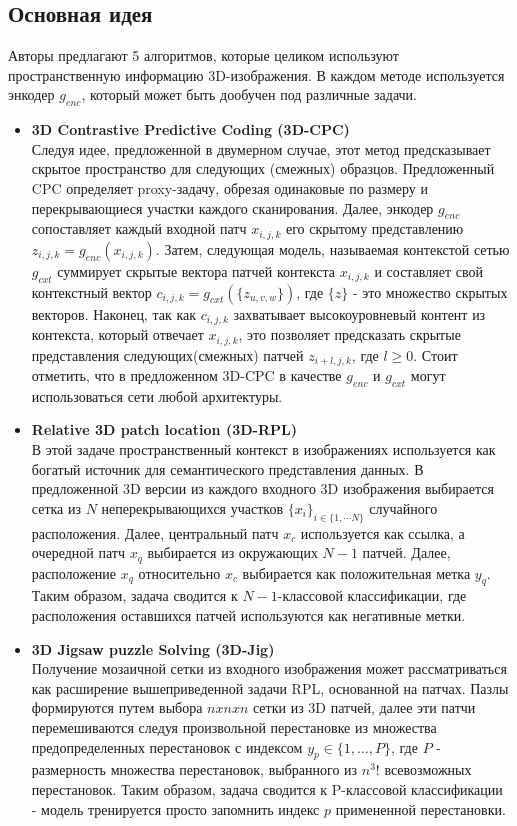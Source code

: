 \subsection*{Основная идея}
Авторы предлагают 5 алгоритмов, которые целиком используют пространственную информацию
3D-изображения. В каждом методе используется энкодер \(g_{enc}\), который 
может быть дообучен под различные задачи.
\begin{itemize}
    \item \textbf{3D Contrastive Predictive Coding (3D-CPC)} \\
    Следуя идее, предложенной в двумерном случае, этот метод предсказывает скрытое 
    пространство для следующих (смежных) образцов. Предложенный CPC определяет 
    proxy-задачу, обрезая одинаковые по размеру и перекрывающиеся участки каждого 
    сканирования. Далее, энкодер \(g_{enc}\) сопоставляет каждый входной патч 
    \(x_{i,j,k}\) его скрытому представлению \(z_{i,j,k}= g_{enc}(x_{i,j,k})\). Затем, 
    следующая модель, называемая контекстой сетью \(g_{cxt}\) суммирует скрытые вектора патчей
    контекста \(x_{i,j,k}\) и составляет свой контекстный вектор 
    \(c_{i,j,k}=g_{cxt}(\{z_{u,v,w}\})\), где \(\{z\}\) - это множество скрытых векторов.
    Наконец, так как \(c_{i,j,k}\) захватывает высокоуровневый контент из контекста, который 
    отвечает \(x_{i,j,k}\), это позволяет предсказать скрытые представления следующих(смежных)
    патчей \(z_{i+l,j,k}\), где \(l\geq 0\). Стоит отметить, что в предложенном 3D-CPC
    в качестве \(g_{enc}\) и \(g_{cxt}\) могут использоваться сети любой архитектуры.
    \item \textbf{Relative 3D patch location (3D-RPL)} \\
    В этой задаче пространственный контекст в изображениях используется 
    как богатый источник для семантического представления данных. В предложенной 
    3D версии из каждого входного 3D изображения выбирается сетка из \(N\)
    неперекрывающихся участков \(\{x_{i}\}_{i\in \{1, \cdots N\}}\) случайного расположения. 
    Далее, центральный патч \(x_c\) используется как ссылка, а очередной патч \(x_q\)
    выбирается из окружающих \(N-1\) патчей. Далее, расположение \(x_q\) относительно \(x_c\)
    выбирается как положительная метка \(y_q\). Таким образом, задача сводится к \(N-1\)-классовой 
    классификации, где расположения оставшихся патчей используются как негативные метки.
    \item \textbf{3D Jigsaw puzzle Solving (3D-Jig)} \\
    Получение мозаичной сетки из входного изображения может рассматриваться как 
    расширение вышеприведенной задачи RPL, основанной на патчах. Пазлы формируются
    путем выбора \(nxnxn\) сетки из 3D патчей, далее эти патчи перемешиваются следуя 
    произвольной перестановке из множества предопределенных перестановок с индексом 
    \(y_{p}\in \{1,\dots , P\}\), где \(P\) - размерность множества перестановок, выбранного
    из \(n^{3}!\) всевозможных перестановок. Таким образом, задача сводится к P-классовой 
    классификации - модель тренируется просто запомнить индекс \(p\) примененной перестановки.


\end{itemize}
